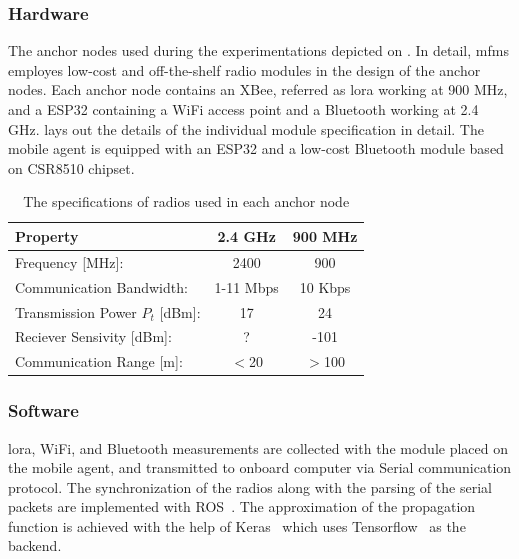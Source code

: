     \subsubsection{Hardware}
    The anchor nodes used during the experimentations depicted on .
    In detail, \gls{mfms} employes low-cost and off-the-shelf radio modules in the design of the anchor nodes.
    Each anchor node contains an XBee, referred as \gls{lora} working at 900 MHz, and a ESP32 containing a WiFi access point and a Bluetooth working at 2.4 GHz.
     lays out the details of the individual module specification in detail.
    The mobile agent is equipped with an ESP32 and a low-cost Bluetooth module based on CSR8510 chipset.
    \begin{table}
    \begin{center}
    \caption{\label{tab:specs}The specifications of radios used in each anchor node}
      \begin{tabular}{@{}lcc@{}}\toprule[1.5pt]
        Property                        &2.4 GHz        &900 MHz\\ \midrule[1.5pt]
        Frequency [MHz]:                &2400           &900 \\ \midrule
        Communication Bandwidth:        &1-11 Mbps      &10 Kbps \\ \midrule
        Transmission Power $P_t$ [dBm]: &17             &24 \\ \midrule
        Reciever Sensivity [dBm]:       &?              &-101 \\ \midrule
        Communication Range [m]:        &$<$20          &$>$100  \\\bottomrule[1.5pt]
      \end{tabular}
    \end{center}
    \end{table}
    \subsubsection{Software}
    \gls{lora}, WiFi, and Bluetooth measurements are collected with the module placed on the mobile agent, and transmitted to onboard computer via Serial communication protocol.
    The synchronization of the radios along with the parsing of the serial packets are implemented with ROS~\cite{quigley2009ros}.
    The approximation of the propagation function is achieved with the help of Keras~\cite{chollet2015} which uses Tensorflow~\cite{tensorflow2015-whitepaper} as the backend.

